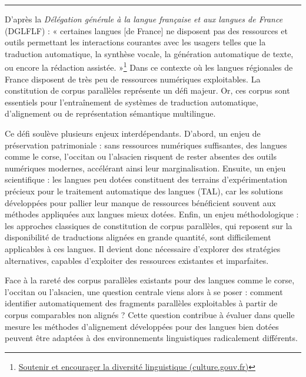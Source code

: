 \noindent\rule{\textwidth}{0.4pt}

D'après la \textit{Délégation générale à la langue française et aux langues de France} (DGLFLF){ :}
{« }certaines langues [de France] ne disposent pas des ressources et outils permettant les interactions
courantes avec les usagers telles que la traduction automatique, la synthèse vocale, la génération
automatique de texte, ou encore la rédaction assistée.{ »}\footnote{
    \href{https://www.culture.gouv.fr/thematiques/langue-francaise-et-langues-de-france/agir-pour-les-langues/innover-dans-le-domaine-des-langues-et-du-numerique/soutenir-et-encourager-la-diversite-linguistique-dans-le-domaine-numerique}
    {Soutenir et encourager la diversité linguistique (culture.gouv.fr)}
}
Dans ce contexte où les langues régionales de France disposent de très peu de ressources numériques
exploitables. La constitution de corpus parallèles représente un défi majeur. Or, ces corpus sont
essentiels pour l’entraînement de systèmes de traduction automatique, d’alignement ou de représentation
sémantique multilingue.

Ce défi soulève plusieurs enjeux interdépendants. D'abord, un enjeu de préservation patrimoniale{ :}
sans ressources numériques suffisantes, des lan\-gues comme le corse, l'occitan ou l'alsacien risquent de rester
absentes des outils numériques modernes, accélérant ainsi leur marginalisation. Ensuite, un enjeu scientifique{ :}
les langues peu dotées constituent des terrains d'expérimentation
précieux pour le traitement automatique des langues (TAL), car les solutions développées pour pallier leur manque de ressources bénéficient
souvent aux méthodes appliquées aux langues mieux dotées. Enfin, un enjeu méthodologique{ :}
les approches classiques de constitution de corpus parallèles, qui reposent sur la disponibilité de
traductions alignées en grande quantité, sont difficilement applicables à ces langues. Il devient donc
nécessaire d'explorer des stratégies alternatives, capables d'exploiter des ressources existantes et
imparfaites.

Face à la rareté des corpus parallèles existants pour des langues comme le corse, l’occitan ou l’alsacien,
une question centrale viens alors à se poser{ :} comment identifier automatiquement des fragments parallèles exploitables
à partir de corpus comparables non alignés{ ?} Cette question contribue
à évaluer dans quelle mesure les méthodes d'alignement développées pour des
langues bien dotées peuvent être adaptées à des environnements linguistiques radicalement différents.

